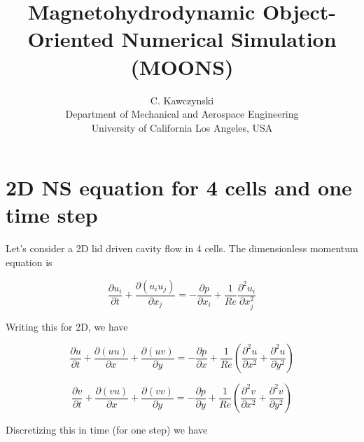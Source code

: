 \documentclass[11pt]{article}
\begin{document}
\doublespacing
\title{Magnetohydrodynamic Object-Oriented Numerical Simulation (MOONS)}
\author{C. Kawczynski \\
Department of Mechanical and Aerospace Engineering \\
University of California Los Angeles, USA\\}
\maketitle
\section{2D NS equation for 4 cells and one time step}

Let's consider a 2D lid driven cavity flow in 4 cells. The dimensionless momentum equation is

\begin{equation}
	\frac{\partial u_i}{\partial t} + 
	\frac{\partial (u_i u_j)}{\partial x_j}
	= 
	- \frac{\partial p}{\partial x_i}
	+ \frac{1}{Re}
	\frac{\partial^2 u_i}{\partial x_j^2}
\end{equation}

Writing this for 2D, we have

\begin{equation}
	\frac{\partial u}{\partial t} +
	\frac{\partial (u u)}{\partial x}
	+\frac{\partial (u v)}{\partial y}
	= 
	- \frac{\partial p}{\partial x}
	+ \frac{1}{Re}
	\left(
	\frac{\partial^2 u}{\partial x^2}
	+
	\frac{\partial^2 u}{\partial y^2}
	\right)
\end{equation}

\begin{equation}
	\frac{\partial v}{\partial t} +
	\frac{\partial (v u)}{\partial x}
	+\frac{\partial (v v)}{\partial y}
	= 
	- \frac{\partial p}{\partial y}
	+ \frac{1}{Re}
	\left(
	\frac{\partial^2 v}{\partial x^2}
	+
	\frac{\partial^2 v}{\partial y^2}
	\right)
\end{equation}

Discretizing this in time (for one step) we have
\end{document}
